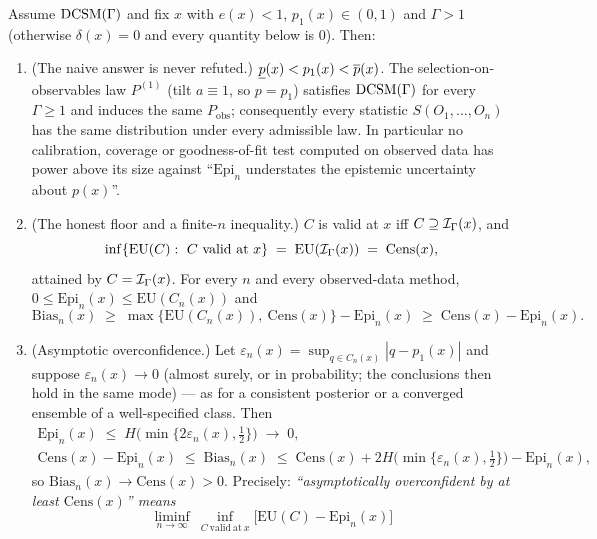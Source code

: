 \begin{corollary}
\label{cor:uq-full}
Assume $\textup{DCSM}(\Gamma)$ and fix $x$ with $e(x)<1$, $p_1(x)\in(0,1)$ and $\Gamma>1$
(otherwise $\delta(x)=0$ and every quantity below is $0$). Then:
\begin{enumerate}
\item[(i)] \textup{(The naive answer is never refuted.)}
  $\underline{p}(x)<p_1(x)<\overline{p}(x)$. The selection-on-observables law $P^{(1)}$
  (tilt $a\equiv1$, so $p=p_1$) satisfies $\textup{DCSM}(\Gamma)$ for every $\Gamma\ge1$ and induces
  the same $P_{\mathrm{obs}}$; consequently every statistic $S(O_1,\dots,O_n)$ has the same
  distribution under every admissible law. In particular no calibration, coverage or
  goodness-of-fit test computed on observed data has power above its size against
  ``$\mathrm{Epi}_n$ understates the epistemic uncertainty about $p(x)$''.
\item[(ii)] \textup{(The honest floor and a finite-$n$ inequality.)}
  $C$ is valid at $x$ iff $C\supseteq\mathcal{I}_\Gamma(x)$, and
  \[
    \inf\{\mathrm{EU}(C):\ C\ \text{valid at }x\}\;=\;\mathrm{EU}(\mathcal{I}_\Gamma(x))\;=\;\mathrm{Cens}(x),
  \]
  attained by $C=\mathcal{I}_\Gamma(x)$. For every $n$ and every observed-data method,
  $0\le\mathrm{Epi}_n(x)\le\mathrm{EU}(C_n(x))$ and
  \begin{equation}
    \mathrm{Bias}_n(x)\;\ge\;\max\big\{\mathrm{EU}(C_n(x)),\ \mathrm{Cens}(x)\big\}-\mathrm{Epi}_n(x)
    \;\ge\;\mathrm{Cens}(x)-\mathrm{Epi}_n(x).
    \label{eq:uq-bias-finite}
  \end{equation}
\item[(iii)] \textup{(Asymptotic overconfidence.)} Let
  $\varepsilon_n(x)=\sup_{q\in C_n(x)}|q-p_1(x)|$ and suppose $\varepsilon_n(x)\to0$
  (almost surely, or in probability; the conclusions then hold in the same mode) --- as for a
  consistent posterior or a converged ensemble of a well-specified class. Then
  \[
  \begin{gathered}
    \mathrm{Epi}_n(x)\;\le\;H\big(\min\{2\varepsilon_n(x),\tfrac12\}\big)\;\longrightarrow\;0,\\
    \mathrm{Cens}(x)-\mathrm{Epi}_n(x)\;\le\;\mathrm{Bias}_n(x)\;\le\;
    \mathrm{Cens}(x)+2H\big(\min\{\varepsilon_n(x),\tfrac12\}\big)-\mathrm{Epi}_n(x),
  \end{gathered}
  \]
  so $\mathrm{Bias}_n(x)\to\mathrm{Cens}(x)>0$. Precisely: \emph{``asymptotically
  overconfident by at least $\mathrm{Cens}(x)$'' means}
  \begin{equation}
    \liminf_{n\to\infty}\ \inf_{C\ \mathrm{valid\ at}\ x}\big[\mathrm{EU}(C)-\mathrm{Epi}_n(x)\big]

\end{equation}
\end{enumerate}
\end{corollary}
